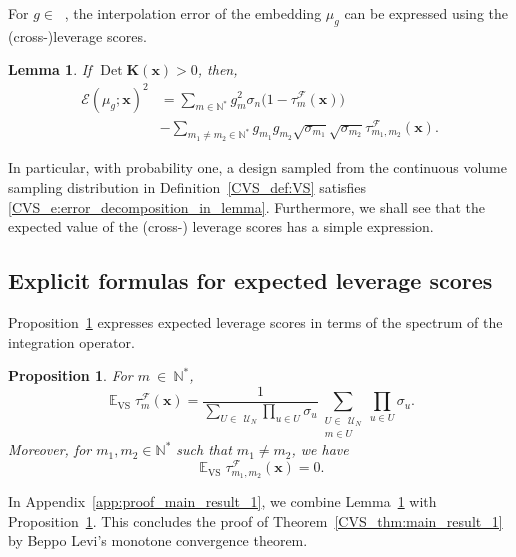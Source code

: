 \documentclass[twoside,11pt]{book}
\newtheorem{proposition}{Proposition}
\newtheorem{lemma}{Lemma}
\numberwithin{theorem}{chapter}
\numberwithin{definition}{chapter}
\numberwithin{proposition}{chapter}
\numberwithin{corollary}{chapter}
\numberwithin{example}{chapter}
\numberwithin{lemma}{chapter}
\numberwithin{assumption}{chapter}
\DeclareMathOperator{\Det}{Det}
\DeclareMathOperator{\VS}{\mathrm{VS}}
\DeclareMathOperator{\EX}{\mathbb{E}}
\DeclareMathOperator{\F}{\mathcal{F}}
\DeclareMathOperator{\Ltwo}{\mathbb{L}_{2}(\mathrm{d} \omega)}
\def\UN{\:\mathcal{U}_N}
\begin{document}
For $g \in \Ltwo$, the interpolation error of the embedding $\mu_{g}$ can be expressed using the (cross-)leverage scores.
\begin{lemma}\label{CVS_lemma:error_decomposition}
If $\Det \bm{K}(\bm{x}) > 0$, then,
\begin{align}
\label{CVS_e:error_decomposition_in_lemma}
\mathcal{E}(\mu_{g};\bm{x})^{2} & = \sum\limits_{m \in \mathbb{N}^{*}}  g_{m}^{2} \sigma_{n}\bigg(1- \tau_{m}^{\F}(\bm{x})\bigg)\\
 & - \sum\limits_{m_{1}\neq m_{2} \in \mathbb{N}^{*}}  g_{m_{1}}g_{m_{2}} \sqrt{\sigma_{m_{1}}} \sqrt{\sigma_{m_{2}}} \tau_{m_{1},m_{2}}^{\F}(\bm{x}). \nonumber
\end{align}
\end{lemma}
In particular, with probability one, a design sampled from the continuous volume sampling distribution in Definition~\ref{CVS_def:VS} satisfies \eqref{CVS_e:error_decomposition_in_lemma}. Furthermore, we shall see that the expected value of the (cross-) leverage scores has a simple expression.


\subsection{Explicit formulas for expected leverage scores}
\label{CVS_sec:closed_formulas}
Proposition~\ref{CVS_prop:EX_VS_lvs} expresses expected leverage scores in terms of the spectrum of the integration operator.
\begin{proposition}\label{CVS_prop:EX_VS_lvs}
For $m~\in~\mathbb{N}^{*}$,
\begin{equation}\label{CVS_eq:lvs_formula}
\EX_{\VS} \tau_{m}^{\F}(\bm{x})  = \frac{1}{\sum\limits_{U \in \: \UN} \prod\limits_{u \in U}\sigma_{u}}  \sum\limits_{\substack{U \in \: \UN \\ m \in U}} \prod\limits_{u \in U}\sigma_{u}.
\end{equation}
Moreover, for $m_{1},m_{2} \in \mathbb{N}^{*}$ such that $m_{1} \neq m_{2}$, we have
\begin{equation}\label{CVS_eq:cross_lvs_zero}
\EX_{\VS} \tau_{m_{1},m_{2}}^{\F}(\bm{x}) = 0.
\end{equation}
\end{proposition}

In Appendix~\ref{app:proof_main_result_1}, we combine Lemma~\ref{CVS_lemma:error_decomposition} with Proposition~\ref{CVS_prop:EX_VS_lvs}. This concludes the proof of Theorem~\ref{CVS_thm:main_result_1} by Beppo Levi's monotone convergence theorem.
\end{document}

